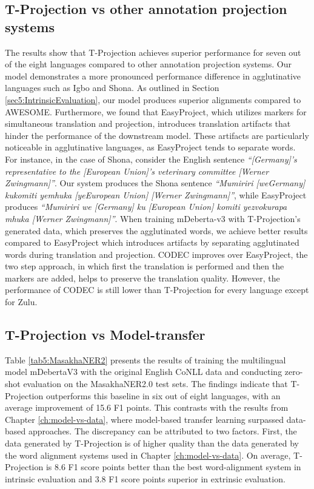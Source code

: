 \subsection{T-Projection vs other annotation projection systems}

The results show that T-Projection achieves superior performance for seven out of the eight languages compared to other annotation projection systems. Our model demonstrates a more pronounced performance difference in agglutinative languages such as Igbo and Shona. As outlined in Section \ref{sec5:IntrinsicEvaluation}, our model produces superior alignments compared to AWESOME. Furthermore, we found that EasyProject, which utilizes markers for simultaneous translation and projection, introduces translation artifacts that hinder the performance of the downstream model. These artifacts are particularly noticeable in agglutinative languages, as EasyProject tends to separate words. For instance, in the case of Shona, consider the English sentence \textit{``[Germany]'s representative to the [European Union]'s veterinary committee [Werner Zwingmann]''}. Our system produces the Shona sentence \textit{``Mumiriri [weGermany] kukomiti yemhuka [yeEuropean Union] [Werner Zwingmann]''}, while EasyProject produces \textit{``Mumiriri we [Germany] ku [European Union] komiti yezvokurapa mhuka [Werner Zwingmann]''}. When training mDeberta-v3 with T-Projection's generated data, which preserves the agglutinated words, we achieve better results compared to EasyProject which introduces artifacts by separating agglutinated words during translation and projection. CODEC improves over EasyProject, the two step approach, in which first the translation is performed and then the markers are added, helps to preserve the translation quality. However, the performance of CODEC is still lower than T-Projection for every language except for Zulu. 

\subsection{T-Projection vs Model-transfer}

Table \ref{tab5:MasakhaNER2} presents the results of training the multilingual model mDebertaV3 with the original English CoNLL data and conducting zero-shot evaluation on the MasakhaNER2.0 test sets. The findings indicate that T-Projection outperforms this baseline in six out of eight languages, with an average improvement of 15.6 F1 points. This contrasts with the results from Chapter \ref{ch:model-vs-data}, where model-based transfer learning surpassed data-based approaches. The discrepancy can be attributed to two factors. 
First, the data generated by T-Projection is of higher quality than the data generated by the word alignment systems used in Chapter \ref{ch:model-vs-data}. On average, T-Projection is 8.6 F1 score points better than the best word-alignment system in intrinsic evaluation and 3.8 F1 score points superior in extrinsic evaluation.

